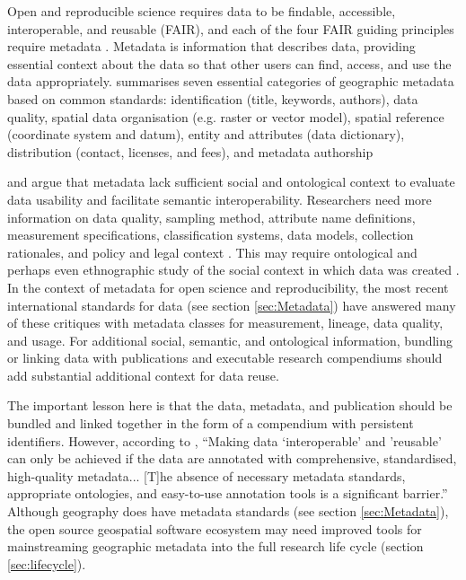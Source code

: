 \documentclass{isprs} %
\begin{document}
Open and reproducible science requires data to be findable, accessible, interoperable, and reusable (FAIR), and each of the four FAIR guiding principles require metadata \citep{Wilkinson2016, NASEM2018}.
Metadata is information that describes data, providing essential context about the data so that other users can find, access, and use the data appropriately.
\citet{Kim1999} summarises seven essential categories of geographic metadata based on common standards: identification (title, keywords, authors), data quality, spatial data organisation (e.g. raster or vector model), spatial reference (coordinate system and datum), entity and attributes (data dictionary), distribution (contact, licenses, and fees), and metadata authorship

\citet{Schuurman2006} and \citet{Comber2008} argue that metadata lack sufficient social and ontological context to evaluate data usability and facilitate semantic interoperability.
Researchers need more information on data quality, sampling method, attribute name definitions, measurement specifications, classification systems, data models, collection rationales, and policy and legal context \citep{Schuurman2006}.
This may require ontological and perhaps even ethnographic study of the social context in which data was created \citep{Schuurman2008}.
In the context of metadata for open science and reproducibility, the most recent international standards for data (see section \ref{sec:Metadata}) have answered many of these critiques with metadata classes for measurement, lineage, data quality, and usage.
For additional social, semantic, and ontological information, bundling or linking data with publications and executable research compendiums should add substantial additional context for data reuse.

The important lesson here is that the data, metadata, and publication should be bundled and linked together in the form of a compendium with persistent identifiers.
However, according to \citet[137-8]{NASEM2018}, ``Making data `interoperable' and 'reusable' can only be achieved if the data are annotated with comprehensive, standardised, high-quality metadata... [T]he absence of necessary metadata standards, appropriate ontologies, and easy-to-use annotation tools is a significant barrier.''
Although geography does have metadata standards (see section \ref{sec:Metadata}), the open source geospatial software ecosystem may need improved tools for mainstreaming geographic metadata into the full research life cycle (section \ref{sec:lifecycle}).
\end{document}
